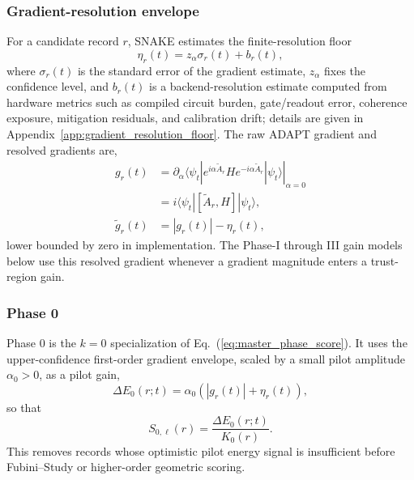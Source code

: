 \documentclass[
  reprint,
  amsmath,
  amssymb,
  aps,
  pra,
  nofootinbib,
  superscriptaddress,
  floatfix
]{revtex4-2}
\begin{document}
\subsubsection{Gradient-resolution envelope}

For a candidate record $r$, SNAKE estimates the finite-resolution floor
\begin{equation}
\eta_r(t)=z_\alpha\sigma_r(t)+b_r(t),
\label{eq:gradient_resolution_floor}
\end{equation}
where $\sigma_r(t)$ is the standard error of the gradient estimate, $z_\alpha$ fixes the confidence level, and $b_r(t)$ is a backend-resolution estimate computed from hardware metrics such as compiled circuit burden, gate/readout error, coherence exposure, mitigation residuals, and calibration drift; details are given in Appendix~\ref{app:gradient_resolution_floor}. The raw ADAPT gradient and resolved gradients are,
\begin{equation}
\begin{aligned}
g_r(t)
&=
\left.
\partial_\alpha
\langle\psi_t|
e^{i\alpha\widetilde A_r}
H
e^{-i\alpha\widetilde A_r}
|\psi_t\rangle
\right|_{\alpha=0}\\
&=
i\langle\psi_t|[\widetilde A_r,H]|\psi_t\rangle,\\
\widetilde g_r(t)
&=|g_r(t)|-\eta_r(t),
\end{aligned}
\label{eq:resolved_gradient}
\end{equation}
lower bounded by zero in implementation. The Phase-I through III gain models below use this resolved gradient whenever a gradient magnitude enters a trust-region gain.

\subsubsection{Phase 0}

Phase 0 is the $k=0$ specialization of Eq.~(\ref{eq:master_phase_score}). It uses the upper-confidence first-order gradient envelope, scaled by a small pilot amplitude $\alpha_0>0$, as a pilot gain,
\begin{equation}
\Delta E_0(r;t)=\alpha_0 \left( |g_r(t)|+\eta_r(t)\right),
\label{eq:phase0_gain}
\end{equation}
so that
\begin{equation}
S_{0,\ell}(r)=\frac{\Delta E_0(r;t)}{K_0(r)}.
\label{eq:phase0_score}
\end{equation}
This removes records whose optimistic pilot energy signal is insufficient before Fubini--Study or higher-order geometric scoring.
\end{document}
